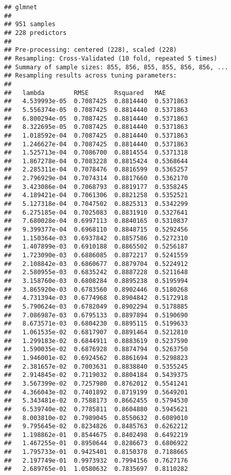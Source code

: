 \documentclass[]{article}
\begin{document}
\begin{verbatim}
## glmnet 
## 
## 951 samples
## 228 predictors
## 
## Pre-processing: centered (228), scaled (228) 
## Resampling: Cross-Validated (10 fold, repeated 5 times) 
## Summary of sample sizes: 855, 856, 855, 855, 856, 856, ... 
## Resampling results across tuning parameters:
## 
##   lambda        RMSE       Rsquared   MAE      
##   4.539993e-05  0.7087425  0.8814440  0.5371863
##   5.556374e-05  0.7087425  0.8814440  0.5371863
##   6.800294e-05  0.7087425  0.8814440  0.5371863
##   8.322695e-05  0.7087425  0.8814440  0.5371863
##   1.018592e-04  0.7087425  0.8814440  0.5371863
##   1.246627e-04  0.7087425  0.8814440  0.5371863
##   1.525713e-04  0.7086700  0.8814554  0.5371318
##   1.867278e-04  0.7083228  0.8815424  0.5368644
##   2.285311e-04  0.7078476  0.8816599  0.5365257
##   2.796929e-04  0.7074314  0.8817660  0.5362170
##   3.423086e-04  0.7068793  0.8819177  0.5358245
##   4.189421e-04  0.7061306  0.8821258  0.5352521
##   5.127318e-04  0.7047502  0.8825313  0.5342299
##   6.275185e-04  0.7025083  0.8831910  0.5327641
##   7.680028e-04  0.6997113  0.8840165  0.5310837
##   9.399377e-04  0.6968110  0.8848715  0.5292456
##   1.150364e-03  0.6937842  0.8857586  0.5272310
##   1.407899e-03  0.6910188  0.8865502  0.5256187
##   1.723090e-03  0.6886085  0.8872217  0.5241559
##   2.108842e-03  0.6860677  0.8879704  0.5224912
##   2.580955e-03  0.6835242  0.8887228  0.5211648
##   3.158760e-03  0.6808284  0.8895238  0.5195994
##   3.865920e-03  0.6783560  0.8902446  0.5180268
##   4.731394e-03  0.6774968  0.8904842  0.5172918
##   5.790624e-03  0.6782049  0.8902294  0.5178885
##   7.086987e-03  0.6795133  0.8897894  0.5190690
##   8.673571e-03  0.6804230  0.8895115  0.5199633
##   1.061535e-02  0.6817907  0.8891464  0.5212810
##   1.299183e-02  0.6844911  0.8883619  0.5237590
##   1.590035e-02  0.6876928  0.8874794  0.5263750
##   1.946001e-02  0.6924562  0.8861694  0.5298823
##   2.381657e-02  0.7003631  0.8838840  0.5355245
##   2.914845e-02  0.7119032  0.8804184  0.5439375
##   3.567399e-02  0.7257980  0.8762012  0.5541241
##   4.366043e-02  0.7401892  0.8719199  0.5649201
##   5.343481e-02  0.7588173  0.8662455  0.5794530
##   6.539740e-02  0.7785811  0.8604880  0.5945621
##   8.003810e-02  0.7989045  0.8550632  0.6089010
##   9.795645e-02  0.8234826  0.8485763  0.6262212
##   1.198862e-01  0.8544675  0.8402498  0.6492219
##   1.467255e-01  0.8950644  0.8286673  0.6806922
##   1.795733e-01  0.9425401  0.8150378  0.7188665
##   2.197749e-01  0.9973932  0.7994156  0.7627176
##   2.689765e-01  1.0580632  0.7835697  0.8110282

\end{verbatim}
\end{document}
